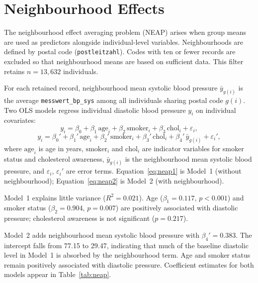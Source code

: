 \section{Neighbourhood Effects}
\label{sec:spatial_neap}

The neighbourhood effect averaging problem (NEAP) arises when group means are used as predictors alongside individual-level variables. Neighbourhoods are defined by postal code (\texttt{postleitzahl}). Codes with ten or fewer records are excluded so that neighbourhood means are based on sufficient data. This filter retains $n = 13{,}632$ individuals.

For each retained record, neighbourhood mean systolic blood pressure $\bar{y}_{g(i)}$ is the average \texttt{messwert\_bp\_sys} among all individuals sharing postal code $g(i)$. Two OLS models regress individual diastolic blood pressure $y_i$ on individual covariates:
\begin{equation}
    y_i = \beta_0 + \beta_1\,\mathrm{age}_i + \beta_2\,\mathrm{smoker}_i + \beta_3\,\mathrm{chol}_i + \varepsilon_i,
    \label{eq:neap1}
\end{equation}
\begin{equation}
    y_i = \beta_0' + \beta_1'\,\mathrm{age}_i + \beta_2'\,\mathrm{smoker}_i + \beta_3'\,\mathrm{chol}_i + \beta_4'\,\bar{y}_{g(i)} + \varepsilon_i',
    \label{eq:neap2}
\end{equation}
where $\mathrm{age}_i$ is age in years, $\mathrm{smoker}_i$ and $\mathrm{chol}_i$ are indicator variables for smoker status and cholesterol awareness, $\bar{y}_{g(i)}$ is the neighbourhood mean systolic blood pressure, and $\varepsilon_i$, $\varepsilon_i'$ are error terms. Equation~\eqref{eq:neap1} is Model~1 (without neighbourhood); Equation~\eqref{eq:neap2} is Model~2 (with neighbourhood).

Model~1 explains little variance ($R^2 = 0.021$). Age ($\beta_1 = 0.117$, $p < 0.001$) and smoker status ($\beta_2 = 0.904$, $p = 0.007$) are positively associated with diastolic pressure; cholesterol awareness is not significant ($p = 0.217$).

Model~2 adds neighbourhood mean systolic blood pressure with $\beta_4' = 0.383$. The intercept falls from 77.15 to 29.47, indicating that much of the baseline diastolic level in Model~1 is absorbed by the neighbourhood term. Age and smoker status remain positively associated with diastolic pressure. Coefficient estimates for both models appear in Table~\ref{tab:neap}.

